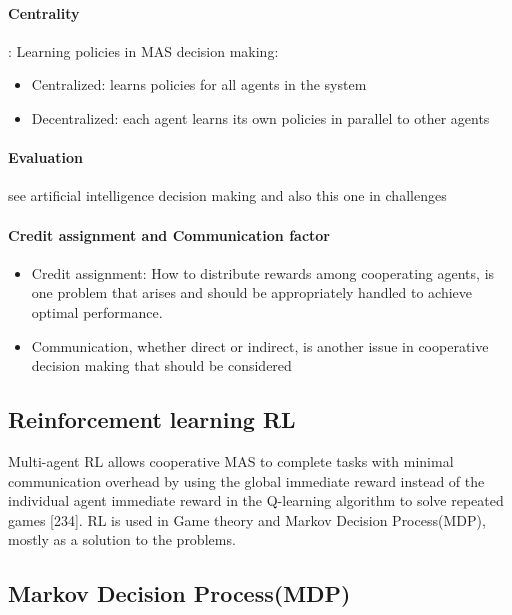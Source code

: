 \documentclass{article}
\begin{document}
		\paragraph{Centrality}: Learning policies in MAS decision making:
			\begin{itemize}
				\item Centralized: learns policies for all agents in the system
				\item Decentralized: each agent learns its own policies in parallel to other agents
			\end{itemize}
	
		\paragraph{Evaluation} see artificial intelligence decision making and also this one in challenges
		
		\paragraph{Credit assignment and Communication factor}	
			\begin{itemize}
				\item Credit assignment: How to distribute rewards among cooperating agents, is one problem that arises and should be appropriately handled to achieve optimal performance.
				\item Communication, whether direct or indirect, is another issue in cooperative decision making that should be considered
			\end{itemize}
		
		
		\subsection{Reinforcement learning RL} 
		Multi-agent RL allows cooperative MAS to complete tasks with minimal communication overhead by using the global immediate reward instead of the individual agent immediate reward in the Q-learning algorithm to solve repeated games \cite{rizk-2019-cooperative-heterogeneous-multi-robot-systems-a-survey}[234]. RL is used in Game theory and Markov Decision Process(MDP), mostly as a solution to the problems. 
		
		\subsection{Markov Decision Process(MDP)}
\end{document}
